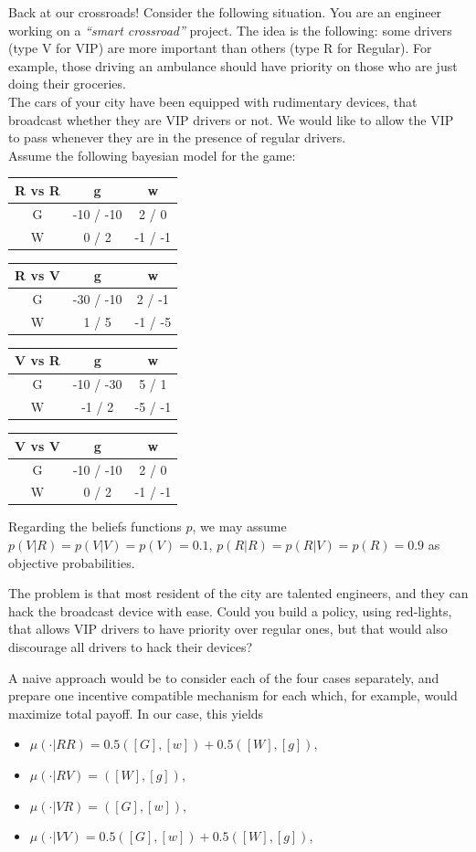 \begin{example}
Back at our crossroads!
Consider the following situation. You are an engineer working on a \emph{``smart crossroad''} project.
The idea is the following: some drivers (type V for VIP) are more important than others (type R for Regular). For example, those driving an ambulance should have priority on those who are just doing their groceries.\\
The cars of your city have been equipped with rudimentary devices, that broadcast whether they are VIP drivers or not. We would like to allow the VIP to pass whenever they are in the presence of regular drivers. \\
Assume the following bayesian model for the game:
\begin{center}
\begin{tabular}{c | c  c}
R vs R & g & w\\
\hline
G & -10 / -10 & 2 / 0  \\
W & 0 / 2 & -1 / -1
\end{tabular}
\begin{tabular}{c | c  c}
R vs V & g & w\\
\hline
G & -30 / -10 & 2 / -1  \\
W & 1 / 5 & -1 / -5
\end{tabular}
\begin{tabular}{c | c  c}
V vs R & g & w\\
\hline
G & -10 / -30 & 5 / 1  \\
W & -1 / 2 & -5 / -1
\end{tabular}
\begin{tabular}{c | c  c}
V vs V & g & w\\
\hline
G & -10 / -10 & 2 / 0  \\
W & 0 / 2 & -1 / -1
\end{tabular}
\end{center}
Regarding the beliefs functions $p$, we may assume $p(V | R) = p(V | V) =  p(V) = 0.1$, $p(R | R) = p(R | V) = p(R) = 0.9$ as objective probabilities.

The problem is that most resident of the city are talented engineers, and they can hack the broadcast device with ease.
Could you build a policy, using red-lights, that allows VIP drivers to have priority over regular ones, but that would also discourage all drivers to hack their devices?



A naive approach would be to consider each of the four cases separately, and prepare one incentive compatible mechanism for each which, for example, would maximize total payoff.
In our case, this yields
\begin{itemize}
\item $\mu(\cdot | RR) = 0.5([G], [w]) + 0.5([W], [g])$,
\item $\mu(\cdot | RV) = ([W], [g])$,
\item $\mu(\cdot | VR) = ([G], [w])$,
\item $\mu(\cdot | VV) = 0.5([G], [w]) + 0.5([W], [g])$,
\end{itemize}


\end{example}
